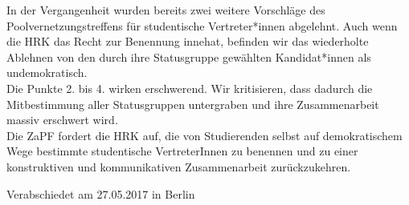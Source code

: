 \documentclass[DIV=calc]{scrartcl}
\begin{document}
In der Vergangenheit wurden bereits zwei weitere Vorschläge des Poolvernetzungstreffens für studentische Vertreter*innen abgelehnt. Auch wenn die HRK das Recht zur Benennung innehat, befinden wir das wiederholte Ablehnen von den durch ihre Statusgruppe gewählten Kandidat*innen als undemokratisch.\\

Die Punkte 2. bis 4. wirken erschwerend. Wir kritisieren, dass dadurch die Mitbestimmung aller Statusgruppen untergraben und ihre Zusammenarbeit massiv erschwert wird. \\

Die ZaPF fordert die HRK auf, die von Studierenden selbst auf demokratischem Wege bestimmte studentische VertreterInnen zu benennen und zu einer konstruktiven und kommunikativen Zusammenarbeit zurückzukehren.

\vfill
\begin{flushright}
Verabschiedet am 27.05.2017 in Berlin
\end{flushright}
\end{document}
